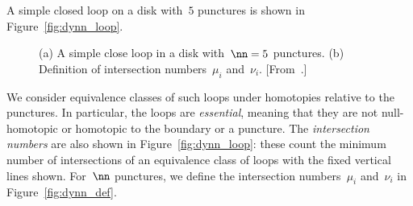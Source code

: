 \documentclass[12pt]{article}
\begin{document}
A simple closed loop on a disk with~$5$ punctures %
%
%
is shown in Figure~\ref{fig:dynn_loop}.
%
\begin{figure}
\begin{center}
\hspace{1em}
\end{center}
\caption{(a) A simple close loop in a disk with~$\nn=5$ punctures.
  (b) Definition of intersection numbers~$\mu_i$ and~$\nu_i$.
  [From~\citet{Thiffeault2010}.] }
\end{figure}
%
We consider equivalence classes of such loops under homotopies %
%
relative to the punctures.  %
%
In particular, the loops are \emph{essential}, %
%
meaning that they are not null-homotopic or homotopic to the boundary or a
puncture.  The \emph{intersection numbers} %
%
%
are also shown in Figure~\ref{fig:dynn_loop}: these count the minimum number
of intersections of an equivalence class of loops with the fixed vertical
lines shown.  For~$\nn$ punctures, we define the intersection numbers~$\mu_i$
and~$\nu_i$ in Figure~\ref{fig:dynn_def}.
\end{document}
